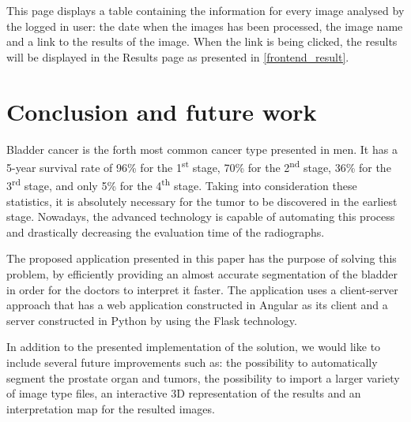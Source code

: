 \documentclass[runningheads,a4paper,11pt]{report}
\begin{document}
This page displays a table containing the information for every image analysed by the logged in user: the date when the images has been processed, the image name and a link to the results of the image. When the link is being clicked, the results will be displayed in the Results page as presented in \ref{frontend_result}.


\vspace{4cm}

\chapter{Conclusion and future work}
\label{chapter:concl}

Bladder cancer is the forth most common cancer type presented in men. It has a 5-year survival rate of 96\% for the 1\textsuperscript{st} stage, 70\% for the 2\textsuperscript{nd} stage, 36\% for the 3\textsuperscript{rd} stage, and only 5\% for the 4\textsuperscript{th} stage. Taking into consideration these statistics, it is absolutely necessary for the tumor to be discovered in the earliest stage. Nowadays, the advanced technology is capable of automating this process and drastically decreasing the evaluation time of the radiographs. 

The proposed application presented in this paper has the purpose of solving this problem, by efficiently providing an almost accurate segmentation of the bladder in order for the doctors to interpret it faster. The application uses a client-server approach that has a web application constructed in Angular as its client and a server constructed in Python by using the Flask technology. 

In addition to the presented implementation of the solution, we would like to include several future improvements such as: the possibility to automatically segment the prostate organ and tumors, the possibility to import a larger variety of image type files, an interactive 3D representation of the results and an interpretation map for the resulted images. 



\end{document}
